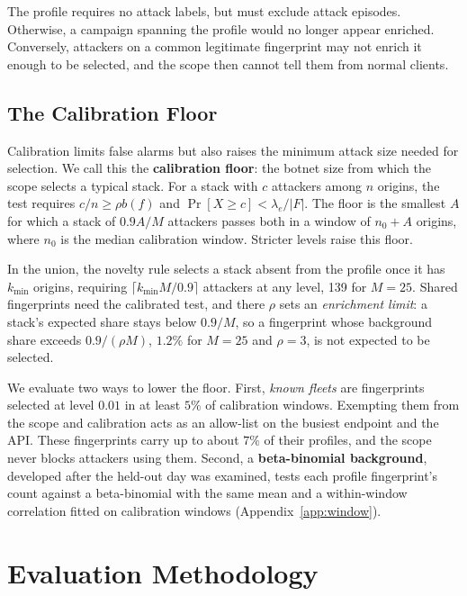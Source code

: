 \documentclass[conference,letterpaper,10pt]{IEEEtran}
\newcommand\1{\textit{(i)}}
\newcommand\2{\textit{(ii)}}
\newcommand\3{\textit{(iii)}}
\newcommand\4{\textit{(iv)}}
\newcommand\5{\textit{(v)}}
\newcommand\6{\textit{(vi)}}
\newcommand\7{\textit{(vii)}}
\newcommand\8{\textit{(viii)}}
\newcommand\9{\textit{(ix)}}
\begin{document}
The profile requires no attack labels, but must exclude
attack episodes. Otherwise, a campaign spanning the
profile would no longer appear enriched. Conversely, attackers on a common legitimate fingerprint may not enrich it enough to be selected, and the scope then cannot tell them from normal clients.

\subsection{The Calibration Floor}
\label{sec:floor}

Calibration limits false alarms but also raises the minimum
attack size needed for selection. We call this the
\textbf{calibration floor}: the botnet size from which the
scope selects a typical stack.
For a stack with $c$ attackers among $n$ origins, the test
requires $c/n\geq\rho b(f)$ and
$\Pr[X\geq c]<\lambda_e/|F|$.
The floor is the smallest $A$ for which a stack of $0.9A/M$
attackers passes both in a window of $n_0+A$ origins, where
$n_0$ is the
median calibration window. Stricter levels raise
this floor.

In the union, the novelty rule selects a stack absent from the
profile once it has $k_{\min}$ origins, requiring $\lceil
k_{\min}M/0.9\rceil$ attackers at any level, 139 for $M=25$.
Shared fingerprints need the calibrated test, and there
$\rho$ sets an \textit{enrichment limit}: a stack's expected
share stays below $0.9/M$, so a fingerprint whose background
share exceeds $0.9/(\rho M)$, $1.2\%$ for $M=25$ and
$\rho=3$, is not expected to be selected.

We evaluate two ways to lower the floor.
First, \textit{known fleets} are fingerprints selected
at level $0.01$ in at least $5\%$ of calibration
windows. Exempting them from the scope and calibration acts as an allow-list on the busiest
endpoint and the API. These fingerprints carry up to about $7\%$ of their profiles, and the scope never blocks
attackers using them. Second, a \textbf{beta-binomial background}, developed after the held-out day was examined, tests each profile fingerprint's count against a beta-binomial with the same mean and a within-window correlation fitted on calibration windows (Appendix~\ref{app:window}).




\section{Evaluation Methodology}
\label{sec:method}
\end{document}
